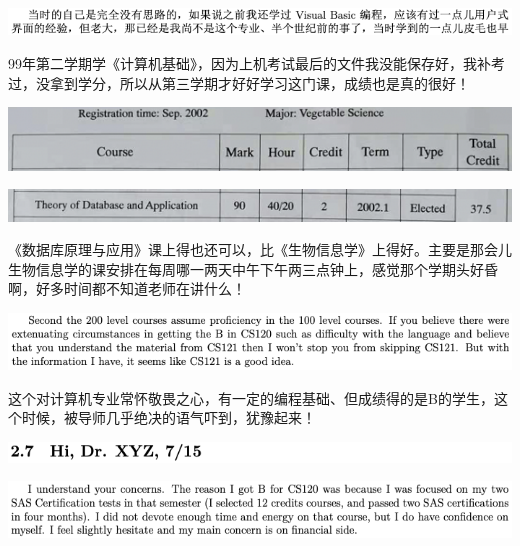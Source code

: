 \documentclass[9pt, b5paper]{article}
\begin{document}
\begin{center}
\includegraphics[width=.9\linewidth]{./pic/backups_plans_20210421_134614.png}
\end{center}

99年第二学期学《计算机基础》，因为上机考试最后的文件我没能保存好，我补考过，没拿到学分，所以从第三学期才好好学习这门课，成绩也是真的很好！

\begin{center}
\includegraphics[width=.9\linewidth]{./pic/backups_plans_20210421_135356.png}
\end{center}

\begin{center}
\includegraphics[width=.9\linewidth]{./pic/backups_plans_20210421_135421.png}
\end{center}

《数据库原理与应用》课上得也还可以，比《生物信息学》上得好。主要是那会儿生物信息学的课安排在每周哪一两天中午下午两三点钟上，感觉那个学期头好昏啊，好多时间都不知道老师在讲什么！

\begin{center}
\includegraphics[width=.9\linewidth]{./pic/backups_plans_20210421_093121.png}
\end{center}

这个对计算机专业常怀敬畏之心，有一定的编程基础、但成绩得的是B的学生，这个时候，被导师几乎绝决的语气吓到，犹豫起来！

\begin{center}
\includegraphics[width=.9\linewidth]{./pic/backups_plans_20210421_093412.png}
\end{center}

\begin{center}
\includegraphics[width=.9\linewidth]{./pic/backups_plans_20210419_085713.png}
\end{center}
\end{document}
